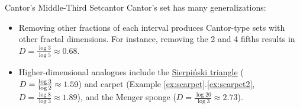 \begin{example}{Cantor's Middle-Third Set}{cantor}
	Cantor's set has many generalizations:
	\begin{itemize}
	  \item Removing other fractions of each interval produces Cantor-type sets with other fractal dimensions. For instance, removing the 2\nd{} and 4\th{} fifths results in $D=\frac{\log 3}{\log 5}\approx 0.68$.
	  \item Higher-dimensional analogues include the \href{https://en.wikipedia.org/wiki/Sierpiński_triangle}{Sierpiński triangle} ($D=\smash[t]{\frac{\log 3}{\log 2}}\approx 1.59$) and carpet (Example \ref*{ex:scarpet}.\ref{ex:scarpet2}, $D=\frac{\log 8}{\log 3}\approx 1.89$), and the Menger sponge ($D=\frac{\log 20}{\log 3}\approx 2.73$).
	\end{itemize}
\end{example}





